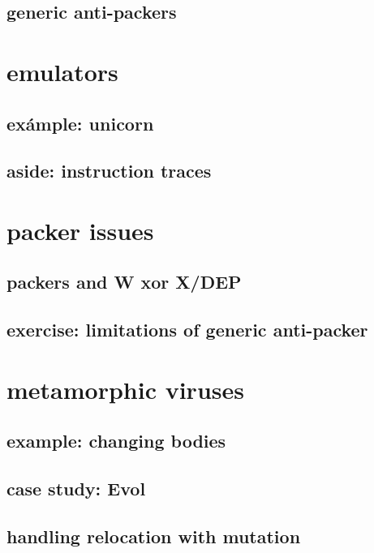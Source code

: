 \subsection{generic anti-packers}



\section{emulators}
\subsection{exámple: unicorn}


\subsection{aside: instruction traces}


\section{packer issues}
\subsection{packers and W xor X/DEP}


\subsection{exercise: limitations of generic anti-packer}


\section{metamorphic viruses}


\subsection{example: changing bodies}


\subsection{case study: Evol}


\subsection{handling relocation with mutation}


